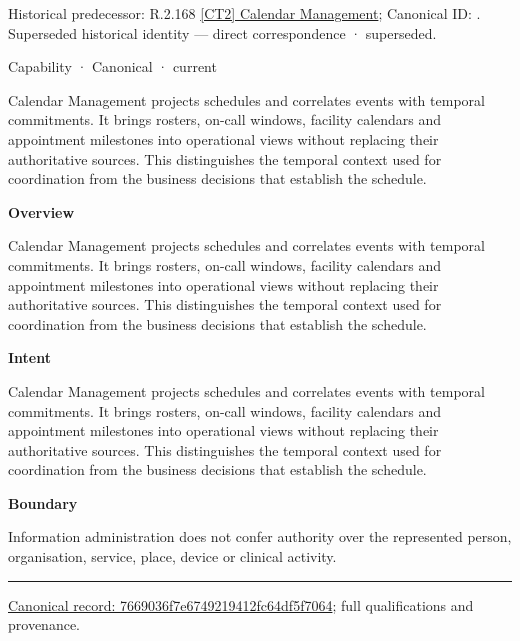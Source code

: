 {\small Historical predecessor: R.2.168 \hyperref[element:8b42aac6083441caa78b59f5e62eebd9]{[CT2] Calendar Management}; Canonical ID: \texttt{}. Superseded historical identity — direct correspondence · superseded.}\par
\label{element:7669036f7e6749219412fc64df5f7064}
{\small Capability · Canonical · current}\par

Calendar Management projects schedules and correlates events with temporal commitments. It brings rosters, on-call windows, facility calendars and appointment milestones into operational views without replacing their authoritative sources. This distinguishes the temporal context used for coordination from the business decisions that establish the schedule.



\textbf{Overview}



Calendar Management projects schedules and correlates events with temporal commitments. It brings rosters, on-call windows, facility calendars and appointment milestones into operational views without replacing their authoritative sources. This distinguishes the temporal context used for coordination from the business decisions that establish the schedule.



\textbf{Intent}



Calendar Management projects schedules and correlates events with temporal commitments. It brings rosters, on-call windows, facility calendars and appointment milestones into operational views without replacing their authoritative sources. This distinguishes the temporal context used for coordination from the business decisions that establish the schedule.



\textbf{Boundary}



Information administration does not confer authority over the represented person, organisation, service, place, device or clinical activity.



\medskip\hrule\medskip

{\footnotesize \href{../../../../../../../continuum/strategy/capability/7669036f7e6749219412fc64df5f7064.md}{Canonical record: 7669036f7e6749219412fc64df5f7064}; full qualifications and provenance.}\par

